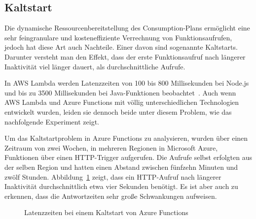 \subsection{Kaltstart}
\label{subsec:coldstart}

Die dynamische Ressourcenbereitstellung des Consumption-Plans ermöglicht eine sehr feingranulare und kosteneffiziente Verrechnung von Funktionsaufrufen, jedoch hat diese Art auch Nachteile. Einer davon sind sogenannte Kaltstarts. Darunter versteht man den Effekt, dass der erste Funktionsaufruf nach längerer Inaktivität viel länger dauert, als durchschnittliche Aufrufe.

In AWS Lambda werden Latenzzeiten von 100 bis 800 Millisekunden bei Node.js und bis zu 3500 Millisekunden bei Java-Funktionen beobachtet~\cite[Kap. 16]{Fuller2016}. Auch wenn AWS Lambda und Azure Functions mit völlig unterschiedlichen Technologien entwickelt wurden, leiden sie dennoch beide unter diesem Problem, wie das nachfolgende Experiment zeigt.

Um das Kaltstartproblem in Azure Functions zu analysieren, wurden über einen Zeitraum von zwei Wochen, in mehreren Regionen in Microsoft Azure, Funktionen über einen HTTP-Trigger aufgerufen. Die Aufrufe selbst erfolgten aus der selben Region und hatten einen Abstand zwischen fünfzehn Minuten und zwölf Stunden. Abbildung~\ref{fig:azfun-latency} zeigt, dass ein HTTP-Aufruf nach längerer Inaktivität durchschnittlich etwa vier Sekunden benötigt. Es ist aber auch zu erkennen, dass die Antwortzeiten sehr große Schwankungen aufweisen.

\begin{figure}[!hbt]%
\caption{Latenzzeiten bei einem Kaltstart von Azure Functions}%
\label{fig:azfun-latency}%
\centering
{}

\end{figure}

